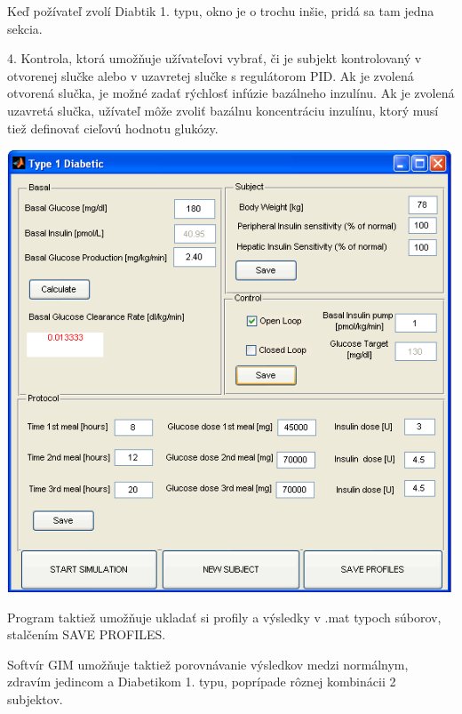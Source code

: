 Keď požívateľ zvolí  Diabtik 1. typu, okno je o trochu inšie, pridá sa tam jedna sekcia.

4. Kontrola, ktorá umožňuje užívateľovi vybrať, či je subjekt kontrolovaný v otvorenej slučke alebo v uzavretej slučke s regulátorom PID. Ak je zvolená otvorená slučka, je možné zadať rýchlosť infúzie bazálneho inzulínu. Ak je zvolená uzavretá slučka, užívateľ môže zvoliť bazálnu koncentráciu inzulínu, ktorý musí tiež definovať cieľovú hodnotu glukózy. 

\includegraphics[scale=0.5]{ob-4.PNG}

Program taktiež umožňuje ukladať si profily a výsledky v .mat typoch súborov, stalčením SAVE PROFILES.

Softvír GIM umožňuje taktiež porovnávanie výsledkov medzi normálnym, zdravím jedincom a Diabetikom 1. typu, poprípade rôznej kombinácii 2 subjektov.